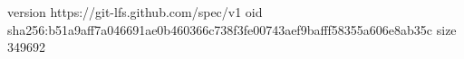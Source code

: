 version https://git-lfs.github.com/spec/v1
oid sha256:b51a9aff7a046691ae0b460366c738f3fe00743aef9bafff58355a606e8ab35c
size 349692
